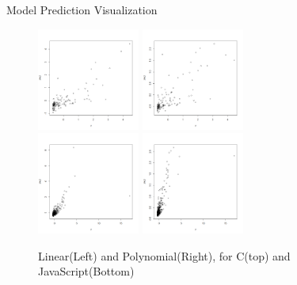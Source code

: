 \documentclass[presentation]{beamer}
\begin{document}
\begin{frame}{Model Prediction Visualization}
  \begin{figure}[ht]
    \scriptsize
    \centering
    \includegraphics[width=0.3\textwidth]{images/langpng/c-linear.png}
    \includegraphics[width=0.3\textwidth]{images/langpng/c-radial.png}\\
    \includegraphics[width=0.3\textwidth]{images/langpng/javascript-linear.png}
    \includegraphics[width=0.3\textwidth]{images/langpng/javascript-radial.png}\\
    \caption{Linear(Left) and Polynomial(Right), for C(top) and JavaScript(Bottom)}
  \end{figure}
\end{frame}
\end{document}
